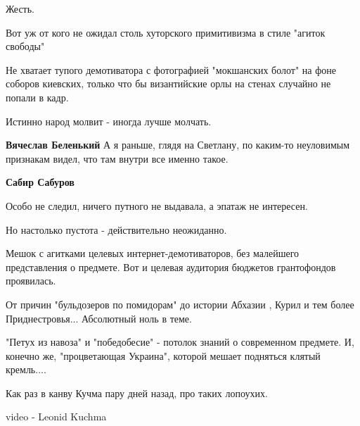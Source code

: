\begin{itemize}
 

Жесть.

Вот уж от кого не ожидал столь хуторского примитивизма в стиле "агиток свободы"

Не хватает тупого демотиватора с фотографией "мокшанских болот" на фоне соборов
киевских, только что бы византийские орлы на стенах случайно не попали в кадр.

Истинно народ молвит - иногда лучше молчать.

\begin{itemize}
 
\textbf{Вячеслав Беленький} А я раньше, глядя на Светлану, по каким-то неуловимым признакам видел, что там внутри все именно такое.

 
\textbf{Сабир Сабуров}

Особо не следил, ничего путного не выдавала, а эпатаж не интересен.

Но настолько пустота - действительно неожиданно.

Мешок с агитками целевых интернет-демотиваторов, без малейшего представления о
предмете. Вот и целевая аудитория бюджетов грантофондов проявилась.

От причин "бульдозеров по помидорам" до истории Абхазии , Курил и тем более
Приднестровья... Абсолютный ноль в теме.

"Петух из навоза" и "победобесие" - потолок знаний о современном предмете. И,
конечно же, "процветающая Украина", которой мешает подняться клятый кремль....

Как раз в канву Кучма пару дней назад, про таких лопоухих.

video - Leonid Kuchma

 

\end{itemize}
\end{itemize}
